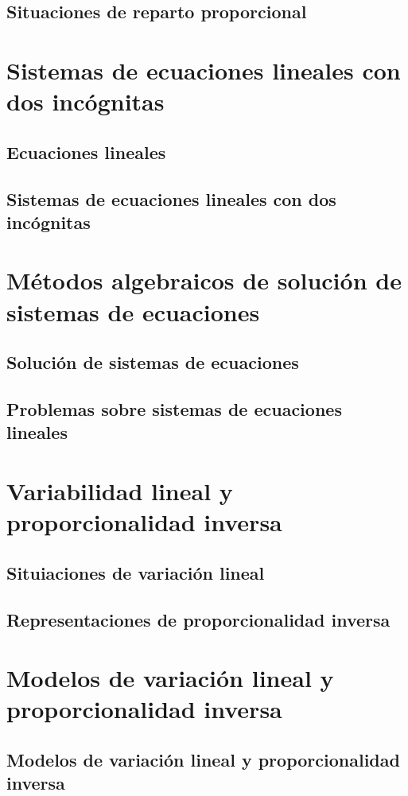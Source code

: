 \documentclass[11pt]{book}
\begin{document}
\subsection{Situaciones de reparto proporcional}

\section{Sistemas de ecuaciones lineales con dos inc\'ognitas}
\subsection{Ecuaciones lineales}
\subsection{Sistemas de ecuaciones lineales con dos inc\'ognitas}

\section{M\'etodos algebraicos de soluci\'on de sistemas de ecuaciones}
\subsection{Soluci\'on de sistemas de ecuaciones}
\subsection{Problemas sobre sistemas de ecuaciones lineales}

\section{Variabilidad lineal y proporcionalidad inversa}
\subsection{Situiaciones de variación lineal}
\subsection{Representaciones de proporcionalidad inversa}

\section{Modelos de variación lineal y proporcionalidad inversa}
\subsection{Modelos de variación lineal y proporcionalidad inversa}
\end{document}
